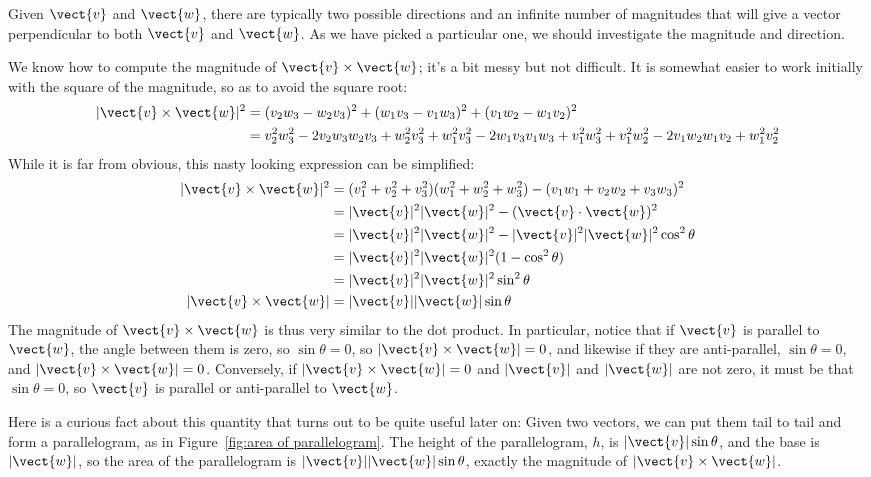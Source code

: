Given $\vect{v}$ and $\vect{w}$, there are typically two possible directions and an
infinite number of magnitudes that will give a vector perpendicular to
both $\vect{v}$ and $\vect{w}$. As we have picked a particular one, we
should investigate the magnitude and direction.

We know how to compute the magnitude of $\vect{v}\times\vect{w}$; it's a
bit messy but not difficult. It is somewhat easier to work initially
with the square of the magnitude, so as to avoid the square root:
\begin{align*}
  |\vect{v}\times \vect{w}|^2&=
  (v_2w_3-w_2v_3)^2+(w_1v_3-v_1w_3)^2+(v_1w_2-w_1v_2)^2	\\
  &=v_2^2w_3^2-2v_2w_3w_2v_3+w_2^2v_3^2+w_1^2v_3^2-2w_1v_3v_1w_3+v_1^2w_3^2+v_1^2w_2^2-2v_1w_2w_1v_2+w_1^2v_2^2
\end{align*}
While it is far from obvious, this nasty looking expression can be
simplified: 
\begin{align*}
  |\vect{v}\times\vect{w}|^2&=
  (v_1^2+v_2^2+v_3^2)(w_1^2+w_2^2+w_3^2)-(v_1w_1+v_2w_2+v_3w_3)^2	\\
  &=|\vect{v}|^2|\vect{w}|^2-(\vect{v}\cdot\vect{w})^2	\\
  &=|\vect{v}|^2|\vect{w}|^2-|\vect{v}|^2|\vect{w}|^2\cos^2\theta	\\
  &=|\vect{v}|^2|\vect{w}|^2(1-\cos^2\theta)	\\
  &=|\vect{v}|^2|\vect{w}|^2\sin^2\theta	\\
  |\vect{v}\times\vect{w}|&=|\vect{v}||\vect{w}|\sin\theta
\end{align*}
The magnitude of $\vect{v}\times\vect{w}$ is thus very similar to the dot
product. In particular, notice that if $\vect{v}$ is parallel to $\vect{w}$,
the angle between them is zero, so $\sin\theta=0$, so 
$|\vect{v}\times\vect{w}|=0$, and likewise if they are anti-parallel, 
$\sin\theta=0$, and
$|\vect{v}\times\vect{w}|=0$. Conversely, if $|\vect{v}\times\vect{w}|=0$
and $|\vect{v}|$ and $|\vect{w}|$ are not zero, it must be that
$\sin\theta=0$, so $\vect{v}$ is parallel or anti-parallel to $\vect{w}$. 

\label{page:parallelogram area} Here is a curious fact about this
quantity that turns out to be quite useful later on: Given two
vectors, we can put them tail to tail and form a
parallelogram, as in Figure~\ref{fig:area of parallelogram}. The
height of the parallelogram, $h$, is $|\vect{v}|\sin\theta$, and the
base is $|\vect{w}|$, so the area of the
parallelogram is $|\vect{v}||\vect{w}|\sin\theta$, exactly the magnitude of $|\vect{v}\times\vect{w}|$.

